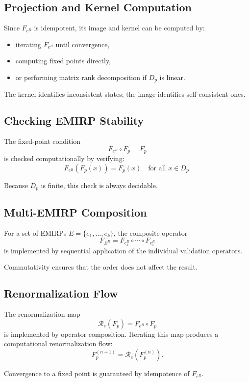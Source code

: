 \documentclass[11pt]{article}
\theoremstyle{definition}
\theoremstyle{plain}
\theoremstyle{remark}
\begin{document}
\subsection{Projection and Kernel Computation}

Since $F_{e^R}$ is idempotent, its image and kernel can be computed by:

\begin{itemize}
    \item iterating $F_{e^R}$ until convergence,
    \item computing fixed points directly,
    \item or performing matrix rank decomposition if $D_p$ is linear.
\end{itemize}

The kernel identifies inconsistent states; the image identifies
self-consistent ones.

\subsection{Checking EMIRP Stability}

The fixed-point condition
\[
F_{e^R} \circ F_p = F_p
\]
is checked computationally by verifying:
\[
F_{e^R}(F_p(x)) = F_p(x)
\quad \text{for all } x \in D_p.
\]

Because $D_p$ is finite, this check is always decidable.

\subsection{Multi-EMIRP Composition}

For a set of EMIRPs $E = \{e_1,\dots,e_k\}$, the composite operator
\[
F_{E^R} = F_{e_k^R} \circ \cdots \circ F_{e_1^R}
\]
is implemented by sequential application of the individual validation
operators.

Commutativity ensures that the order does not affect the result.

\subsection{Renormalization Flow}

The renormalization map
\[
\mathcal{R}_e(F_p) = F_{e^R} \circ F_p
\]
is implemented by operator composition. Iterating this map produces a
computational renormalization flow:
\[
F_p^{(n+1)} = \mathcal{R}_e(F_p^{(n)}).
\]

Convergence to a fixed point is guaranteed by idempotence of $F_{e^R}$.
\end{document}
